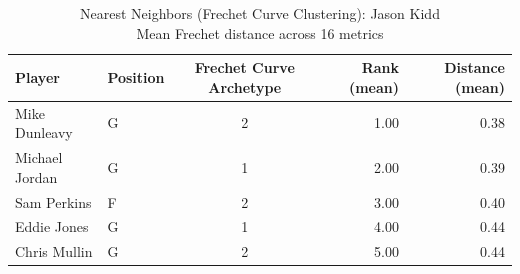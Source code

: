 \begin{table}[t]
\caption*{
{\fontsize{20}{25} Nearest Neighbors (Frechet Curve Clustering): Jason Kidd\fontsize{12}{15}\selectfont } \\ 
{\fontsize{14}{17}\selectfont  Mean Frechet distance across 16 metrics\fontsize{12}{15}\selectfont }
} 
\fontsize{12.0pt}{14.0pt}\selectfont
\begin{tabular*}{\linewidth}{@{\extracolsep{\fill}}llcrr}
\toprule
Player & Position & Frechet Curve Archetype & Rank (mean) & Distance (mean) \\ 
\midrule\addlinespace[2.5pt]
Mike Dunleavy & G & 2 & 1.00 & 0.38 \\ 
Michael Jordan & G & 1 & 2.00 & 0.39 \\ 
Sam Perkins & F & 2 & 3.00 & 0.40 \\ 
Eddie Jones & G & 1 & 4.00 & 0.44 \\ 
Chris Mullin & G & 2 & 5.00 & 0.44 \\ 
\bottomrule
\end{tabular*}
\end{table}

